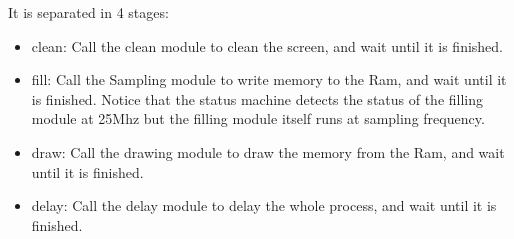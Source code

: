 \documentclass[11pt]{scrartcl}
\begin{document}
It is separated in 4 stages:
\begin{itemize}
    \item clean:
    Call the clean module to clean the screen, and wait until it is finished.
    \item fill:
    Call the Sampling module to write memory to the Ram, and wait until it is finished. Notice that the status machine detects the status of the filling module at 25Mhz but the filling module itself runs at sampling frequency.
    \item draw:
    Call the drawing module to draw the memory from the Ram, and wait until it is finished.
    \item delay:
    Call the delay module to delay the whole process, and wait until it is finished.
\end{itemize}
\end{document}
